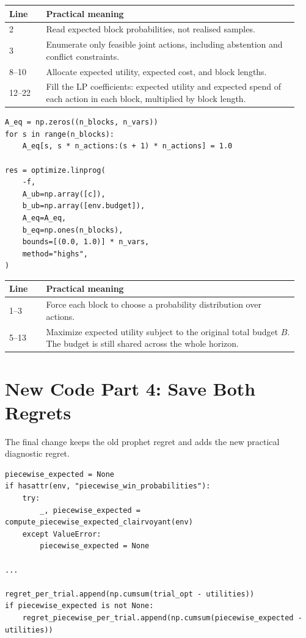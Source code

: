 \documentclass[10pt,a4paper]{article}
\begin{document}
\begin{tabular}{@{}p{0.12\linewidth}p{0.82\linewidth}@{}}
\toprule
Line & Practical meaning \\
\midrule
2 & Read expected block probabilities, not realised samples. \\
3 & Enumerate only feasible joint actions, including abstention and conflict constraints. \\
8--10 & Allocate expected utility, expected cost, and block lengths. \\
12--22 & Fill the LP coefficients: expected utility and expected spend of each action in each block, multiplied by block length. \\
\bottomrule
\end{tabular}

\begin{lstlisting}[style=goodpython]
A_eq = np.zeros((n_blocks, n_vars))
for s in range(n_blocks):
    A_eq[s, s * n_actions:(s + 1) * n_actions] = 1.0

res = optimize.linprog(
    -f,
    A_ub=np.array([c]),
    b_ub=np.array([env.budget]),
    A_eq=A_eq,
    b_eq=np.ones(n_blocks),
    bounds=[(0.0, 1.0)] * n_vars,
    method="highs",
)
\end{lstlisting}

\begin{tabular}{@{}p{0.12\linewidth}p{0.82\linewidth}@{}}
\toprule
Line & Practical meaning \\
\midrule
1--3 & Force each block to choose a probability distribution over actions. \\
5--13 & Maximize expected utility subject to the original total budget \(B\). The budget is still shared across the whole horizon. \\
\bottomrule
\end{tabular}

\section{New Code Part 4: Save Both Regrets}
The final change keeps the old prophet regret and adds the new practical diagnostic regret.

\begin{lstlisting}[style=goodpython]
piecewise_expected = None
if hasattr(env, "piecewise_win_probabilities"):
    try:
        _, piecewise_expected = compute_piecewise_expected_clairvoyant(env)
    except ValueError:
        piecewise_expected = None

...

regret_per_trial.append(np.cumsum(trial_opt - utilities))
if piecewise_expected is not None:
    regret_piecewise_per_trial.append(np.cumsum(piecewise_expected - utilities))
\end{lstlisting}
\end{document}
